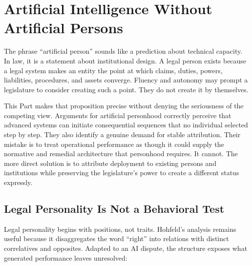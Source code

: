 \section{Artificial Intelligence Without Artificial Persons}
\label{sec:personhood}

The phrase ``artificial person'' sounds like a prediction about technical capacity. In law, it is a statement about institutional design. A legal person exists because a legal system makes an entity the point at which claims, duties, powers, liabilities, procedures, and assets converge. Fluency and autonomy may prompt a legislature to consider creating such a point. They do not create it by themselves.

This Part makes that proposition precise without denying the seriousness of the competing view. Arguments for artificial personhood correctly perceive that advanced systems can initiate consequential sequences that no individual selected step by step. They also identify a genuine demand for stable attribution. Their mistake is to treat operational performance as though it could supply the normative and remedial architecture that personhood requires. It cannot. The more direct solution is to attribute deployment to existing persons and institutions while preserving the legislature's power to create a different status expressly.

\subsection{Legal Personality Is Not a Behavioral Test}

Legal personality begins with positions, not traits. Hohfeld's analysis remains useful because it disaggregates the word ``right'' into relations with distinct correlatives and opposites. Adapted to an AI dispute, the structure exposes what generated performance leaves unresolved:

